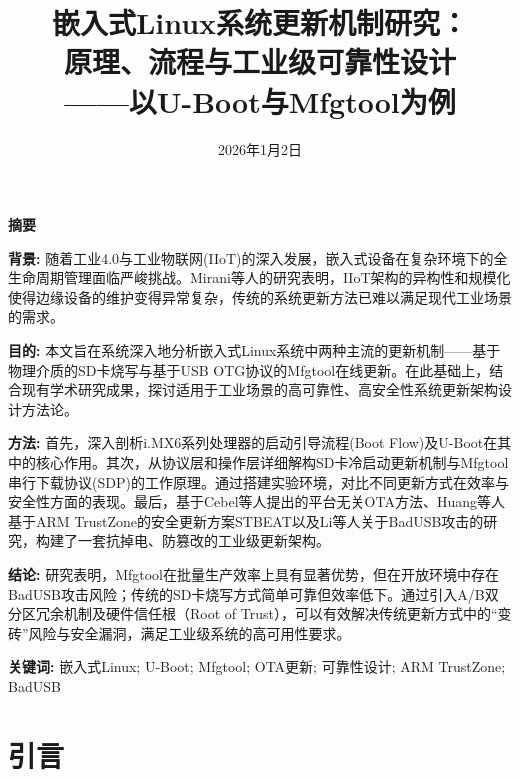 \documentclass[a4paper,12pt]{article}
\title{嵌入式Linux系统更新机制研究：\\原理、流程与工业级可靠性设计\\——以U-Boot与Mfgtool为例}
\date{2026年1月2日}
\makeatletter
\renewcommand{\maketitle}{
  \begin{center}
    \vspace*{1em}
    {\zihao{2}\songti\bfseries \@title \par} %
    \vspace{2em}
    {\zihao{-4}\songti \@author \par}
    \vspace{1em}
    {\zihao{-4}\songti \@date \par}
    \vspace{3em}
  \end{center}
}
\makeatother
\begin{document}


\maketitle

\begin{center}
    \songti\bfseries 摘\quad 要
\end{center}
\vspace{0.5em}

{\songti
\noindent
\textbf{背景:} 随着工业4.0与工业物联网(IIoT)的深入发展，嵌入式设备在复杂环境下的全生命周期管理面临严峻挑战。Mirani等人的研究表明，IIoT架构的异构性和规模化使得边缘设备的维护变得异常复杂，传统的系统更新方法已难以满足现代工业场景的需求\cite{Mirani2022}。

\textbf{目的:} 本文旨在系统深入地分析嵌入式Linux系统中两种主流的更新机制——基于物理介质的SD卡烧写与基于USB OTG协议的Mfgtool在线更新。在此基础上，结合现有学术研究成果，探讨适用于工业场景的高可靠性、高安全性系统更新架构设计方法论。

\textbf{方法:} 首先，深入剖析i.MX6系列处理器的启动引导流程(Boot Flow)及U-Boot在其中的核心作用。其次，从协议层和操作层详细解构SD卡冷启动更新机制与Mfgtool串行下载协议(SDP)的工作原理。通过搭建实验环境，对比不同更新方式在效率与安全性方面的表现。最后，基于Cebel等人提出的平台无关OTA方法\cite{Cebel2022}、Huang等人基于ARM TrustZone的安全更新方案STBEAT\cite{Huang2022}以及Li等人关于BadUSB攻击的研究\cite{Li2025}，构建了一套抗掉电、防篡改的工业级更新架构。

\textbf{结论:} 研究表明，Mfgtool在批量生产效率上具有显著优势，但在开放环境中存在BadUSB攻击风险；传统的SD卡烧写方式简单可靠但效率低下。通过引入A/B双分区冗余机制及硬件信任根（Root of Trust），可以有效解决传统更新方式中的“变砖”风险与安全漏洞，满足工业级系统的高可用性要求。

\vspace{0.5cm}
\noindent \textbf{关键词:} 嵌入式Linux; U-Boot; Mfgtool; OTA更新; 可靠性设计; ARM TrustZone; BadUSB
}

\newpage
\tableofcontents
\newpage

\newpage
\section{引言}
\end{document}
